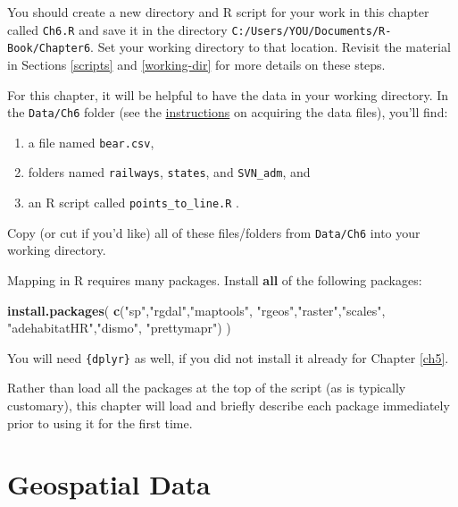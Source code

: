 \documentclass[]{book}
\newenvironment{Shaded}{\begin{snugshade}}{\end{snugshade}}
\newcommand{\KeywordTok}[1]{\textcolor[rgb]{0.13,0.29,0.53}{\textbf{#1}}}
\newcommand{\StringTok}[1]{\textcolor[rgb]{0.31,0.60,0.02}{#1}}
\newcommand{\NormalTok}[1]{#1}
\providecommand{\tightlist}{%
  \setlength{\itemsep}{0pt}\setlength{\parskip}{0pt}}
\theoremstyle{definition}
\theoremstyle{definition}
\theoremstyle{definition}
\theoremstyle{remark}
\begin{document}
You should create a new directory and R script for your work in this
chapter called \texttt{Ch6.R} and save it in the directory
\texttt{C:/Users/YOU/Documents/R-Book/Chapter6}. Set your working
directory to that location. Revisit the material in Sections
\ref{scripts} and \ref{working-dir} for more details on these steps.

For this chapter, it will be helpful to have the data in your working
directory. In the \texttt{Data/Ch6} folder (see the
\protect\hyperlink{data-sets}{instructions} on acquiring the data
files), you'll find:

\begin{enumerate}
\def\labelenumi{\arabic{enumi}.}
\tightlist
\item
  a file named \texttt{bear.csv},
\item
  folders named \texttt{railways}, \texttt{states}, and
  \texttt{SVN\_adm}, and
\item
  an R script called \texttt{points\_to\_line.R}
  \citep{points-line-cite}.
\end{enumerate}

Copy (or cut if you'd like) all of these files/folders from
\texttt{Data/Ch6} into your working directory.

Mapping in R requires many packages. Install \textbf{all} of the
following packages:

\begin{Shaded}
\begin{Highlighting}[]
\KeywordTok{install.packages}\NormalTok{(}
  \KeywordTok{c}\NormalTok{(}\StringTok{"sp"}\NormalTok{,}\StringTok{"rgdal"}\NormalTok{,}\StringTok{"maptools"}\NormalTok{,}
  \StringTok{"rgeos"}\NormalTok{,}\StringTok{"raster"}\NormalTok{,}\StringTok{"scales"}\NormalTok{,}
  \StringTok{"adehabitatHR"}\NormalTok{,}\StringTok{"dismo"}\NormalTok{, }\StringTok{"prettymapr"}\NormalTok{)}
\NormalTok{)}
\end{Highlighting}
\end{Shaded}

You will need \texttt{\{dplyr\}} \citep{R-dplyr} as well, if you did not
install it already for Chapter \ref{ch5}.

Rather than load all the packages at the top of the script (as is
typically customary), this chapter will load and briefly describe each
package immediately prior to using it for the first time.

\section{Geospatial Data}\label{intro}
\end{document}
